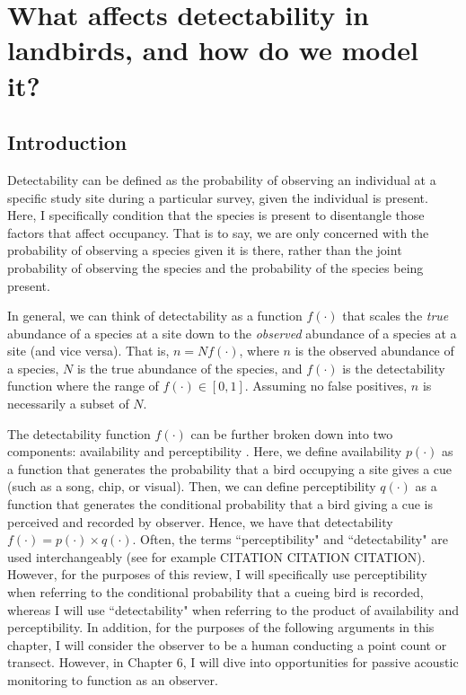 \chapter{What affects detectability in landbirds, and how do we model it?}

\section{Introduction}

\par Detectability can be defined as the probability of observing an individual at a specific study site during a particular survey, given the individual is present.
Here, I specifically condition that the species is present to disentangle those factors that affect occupancy.
That is to say, we are only concerned with the probability of observing a species given it is there, rather than the joint probability of observing the species and the probability of the species being present.

\par In general, we can think of detectability as a function $f(\cdot)$ that scales the \textit{true} abundance of a species at a site down to the \textit{observed} abundance of a species at a site (and vice versa). 
That is, $n = Nf(\cdot)$, where $n$ is the observed abundance of a species, $N$ is the true abundance of the species, and $f(\cdot)$ is the detectability function where the range of $f(\cdot) \in [0,1]$.
Assuming no false positives, $n$ is necessarily a subset of $N$.

\par The detectability function $f(\cdot)$ can be further broken down into two components: availability and perceptibility \citep{marsh_correcting_1989}.
Here, we define availability $p(\cdot)$ as a function that generates the probability that a bird occupying a site gives a cue (such as a song, chip, or visual).
Then, we can define perceptibility $q(\cdot)$ as a function that generates the conditional probability that a bird giving a cue is perceived and recorded by observer.
Hence, we have that detectability $f(\cdot) = p(\cdot) \times q(\cdot)$.
Often, the terms ``perceptibility" and ``detectability" are used interchangeably (see for example CITATION CITATION CITATION).
However, for the purposes of this review, I will specifically use perceptibility when referring to the conditional probability that a cueing bird is recorded, whereas I will use ``detectability" when referring to the product of availability and perceptibility.
In addition, for the purposes of the following arguments in this chapter, I will consider the observer to be a human conducting a point count or transect. However, in Chapter 6, I will dive into opportunities for passive acoustic monitoring to function as an observer.

